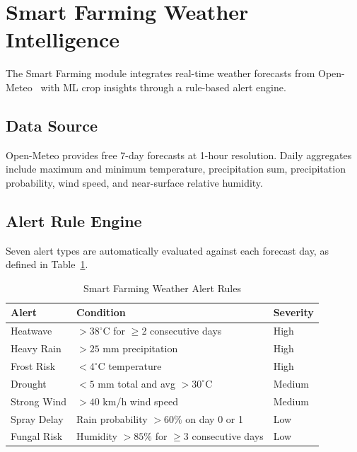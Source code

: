 \documentclass[conference]{IEEEtran}
\begin{document}
\section{Smart Farming Weather Intelligence}

The Smart Farming module integrates real-time weather forecasts from
Open-Meteo~\cite{zippenfenig2023} with ML crop insights through a rule-based
alert engine.

\subsection{Data Source}

Open-Meteo provides free 7-day forecasts at 1-hour resolution. Daily aggregates include maximum and minimum temperature, precipitation sum,
precipitation probability, wind speed, and near-surface relative humidity.

\subsection{Alert Rule Engine}

Seven alert types are automatically evaluated against each forecast day, as
defined in Table~\ref{tab:alerts}.

\begin{table}[htbp]
  \caption{Smart Farming Weather Alert Rules}
  \label{tab:alerts}
  \centering
  \renewcommand{\arraystretch}{1.2}
  \begin{tabular}{lll}
    \toprule
    \textbf{Alert} & \textbf{Condition} & \textbf{Severity} \\
    \midrule
    Heatwave    & $>38^\circ$C for $\geq$2 consecutive days & High \\
    Heavy Rain  & $>25$ mm precipitation                    & High \\
    Frost Risk  & $<4^\circ$C temperature                   & High \\
    Drought     & $<5$ mm total and avg $>30^\circ$C        & Medium \\
    Strong Wind & $>40$ km/h wind speed                     & Medium \\
    Spray Delay & Rain probability $>60\%$ on day 0 or 1   & Low \\
    Fungal Risk & Humidity $>85\%$ for $\geq$3 consecutive days & Low \\
    \bottomrule
  \end{tabular}
\end{table}
\end{document}
